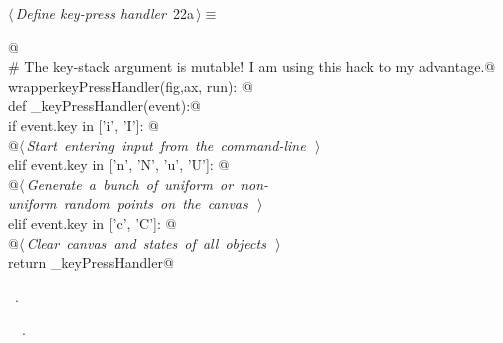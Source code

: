 \documentclass[11.5pt]{report}
\begin{document}
\begin{flushleft} \small
\begin{minipage}{\linewidth}\label{scrap13}\raggedright\small
{} $\langle\,${\itshape Define key-press handler}\nobreak\ {\footnotesize {22a}}$\,\rangle\equiv$
\vspace{-1ex}
\begin{list}{}{} \item
\mbox{}\verb@   @\\
\mbox{}\verb@# The key-stack argument is mutable! I am using this hack to my advantage.@\\
\mbox{}\verb@def wrapperkeyPressHandler(fig,ax, run): @\\
\mbox{}\verb@       def _keyPressHandler(event):@\\
\mbox{}\verb@           if event.key in ['i', 'I']:  @\\
\mbox{}\verb@                @\hbox{$\langle\,${\itshape Start entering input from the command-line}\nobreak\ {\footnotesize {}}$\,\rangle$}\verb@@\\
\mbox{}\verb@           elif event.key in ['n', 'N', 'u', 'U']: @\\
\mbox{}\verb@                @\hbox{$\langle\,${\itshape Generate a bunch of uniform or non-uniform random points on the canvas}\nobreak\ {\footnotesize {}}$\,\rangle$}\verb@@\\
\mbox{}\verb@           elif event.key in ['c', 'C']: @\\
\mbox{}\verb@                @\hbox{$\langle\,${\itshape Clear canvas and states of all objects}\nobreak\ {\footnotesize {}}$\,\rangle$}\verb@@\\
\mbox{}\verb@       return _keyPressHandler@\\
\mbox{}\verb@@{\NWsep}
\end{list}
\vspace{-1.5ex}
\footnotesize
\begin{list}{}{\setlength{\itemsep}{-\parsep}\setlength{\itemindent}{-\leftmargin}}
\item \NWtxtMacroRefIn\ .
\item \NWtxtIdentsDefed\nobreak\  \verb@wrapperkeyPressHandler@\nobreak\ .
\item{}
\end{list}
\end{minipage}\vspace{4ex}
\end{flushleft}
\end{document}
